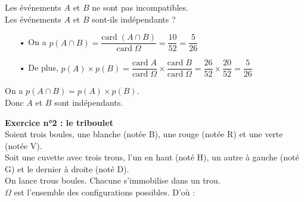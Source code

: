 Les événements $A$ et $B$ ne sont pas incompatibles. \\

Les événements $A$ et $B$ sont-ils indépendants ? \\

\begin{itemize}
\item[•] On a $p\left(A \cap B\right) = \dfrac{\mathrm{card \;}\left(A \cap B\right)}{\mathrm{card \;} \Omega} = \dfrac{10}{52} = \dfrac{5}{26}$ \vspace*{.3cm} \\
\item[•] De plus, $p\left(A\right) \times p\left(B\right) = \dfrac{\mathrm{card \;} A}{\mathrm{card \;} \Omega} \times \dfrac{\mathrm{card \;} B}{\mathrm{card \;} \Omega} = \dfrac{26}{52} \times \dfrac{20}{52} = \dfrac{5}{26}$ \\
\end{itemize}

\vspace*{.3cm}

On a $p\left(A \cap B\right) = p\left(A\right) \times p\left(B\right)$. \\

Donc $A$ et $B$ sont indépendants. 

\newpage

\textbf{Exercice n°2 : le triboulet} \\

Soient trois boules, une blanche (notée B), une rouge (notée R) et une verte (notée V). \\
Soit une cuvette avec trois trous, l'un en haut (noté H), un autre à gauche (noté G) et le dernier à droite (noté D). \\

On lance trous boules. Chacune s'immobilise dans un trou. \\

$\Omega$ est l'ensemble des configurations possibles. D'où : \\

